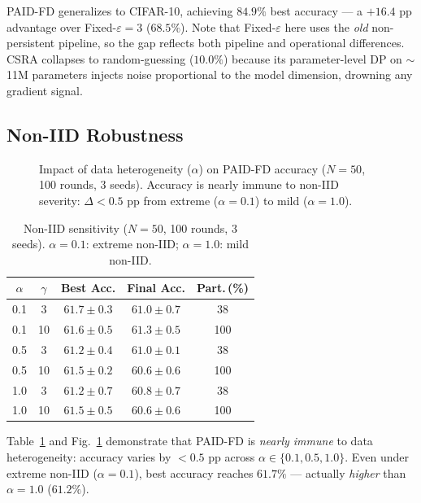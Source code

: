 PAID-FD generalizes to CIFAR-10, achieving $84.9\%$ best accuracy ---
a $+16.4$ pp advantage over Fixed-$\varepsilon{=}3$ ($68.5\%$).
Note that Fixed-$\varepsilon$ here uses the \emph{old} non-persistent pipeline,
so the gap reflects both pipeline and operational differences.
CSRA collapses to random-guessing ($10.0\%$) because its parameter-level
DP on $\sim$11M parameters injects noise proportional to the model
dimension, drowning any gradient signal.

\subsection{Non-IID Robustness}\label{sec:noniid}

\begin{figure}[t]
\centering
\caption{Impact of data heterogeneity ($\alpha$) on PAID-FD accuracy
($N = 50$, 100 rounds, 3 seeds).
Accuracy is nearly immune to non-IID severity:
$\Delta < 0.5$ pp from extreme ($\alpha = 0.1$) to mild ($\alpha = 1.0$).}
\label{fig:noniid}
\end{figure}

\begin{table}[t]
\centering
\caption{Non-IID sensitivity ($N = 50$, 100 rounds, 3 seeds).
$\alpha = 0.1$: extreme non-IID; $\alpha = 1.0$: mild non-IID.}
\label{tab:noniid}
\begin{tabular}{ccccc}
\toprule
$\alpha$ & $\gamma$ & Best Acc. & Final Acc. & Part.\,(\%) \\
\midrule
0.1 & 3  & $61.7 \pm 0.3$ & $61.0 \pm 0.7$ & 38 \\
0.1 & 10 & $61.6 \pm 0.5$ & $61.3 \pm 0.5$ & 100 \\
0.5 & 3  & $61.2 \pm 0.4$ & $61.0 \pm 0.1$ & 38 \\
0.5 & 10 & $61.5 \pm 0.2$ & $60.6 \pm 0.6$ & 100 \\
1.0 & 3  & $61.2 \pm 0.7$ & $60.8 \pm 0.7$ & 38 \\
1.0 & 10 & $61.5 \pm 0.5$ & $60.6 \pm 0.6$ & 100 \\
\bottomrule
\end{tabular}
\end{table}

Table~\ref{tab:noniid} and Fig.~\ref{fig:noniid} demonstrate that
PAID-FD is \emph{nearly immune} to data heterogeneity:
accuracy varies by $< 0.5$ pp across $\alpha \in \{0.1, 0.5, 1.0\}$.
Even under extreme non-IID ($\alpha = 0.1$), best accuracy reaches
$61.7\%$ --- actually \emph{higher} than $\alpha = 1.0$ ($61.2\%$).

